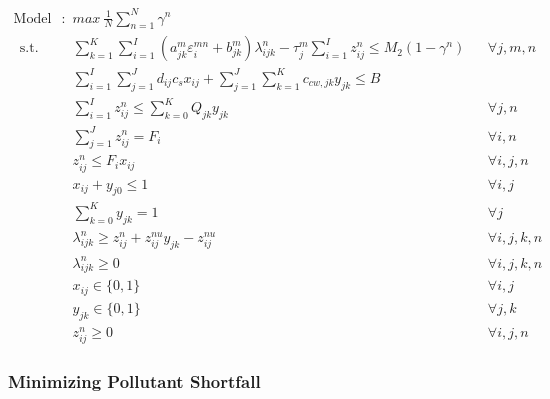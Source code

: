\documentclass[preprint,12pt,authoryear]{elsarticle}
\begin{document}
\begin{align}\label{modelS1}
	\text{Model S1}:~~&max ~ \frac{1}{N}\sum_{n=1}^N \gamma^n \nonumber \\~~
	\mbox{s.t.}~~
	&\sum_{k=1}^K \sum_{i=1}^I (a_{jk}^m \varepsilon_i^{mn} + b_{jk}^m) \lambda_{ijk}^n - \tau_j^m \sum_{i=1}^I z_{ij}^n \leq M_2 (1-\gamma^n) && \forall j,m,n\\	
	&\sum_{i=1}^{I}\sum_{j=1}^{J}d_{ij}c_s x_{ij} + \sum_{j=1}^{J}\sum_{k=1}^{K}c_{cw,jk}y_{jk} \leq B && \\
 	&\sum_{i=1}^{I} z_{ij}^n \leq \sum_{k=0}^K Q_{jk} y_{jk} && \forall j,n\\
	&\sum_{j=1}^J z_{ij}^n = F_i && \forall i,n\\
	&z_{ij}^n \leq F_i x_{ij} && \forall i,j,n\\
	&x_{ij} + y_{j0} \leq 1 && \forall i,j\\
	&\sum_{k=0}^{K}y_{jk} = 1&&\forall j\\
	&\lambda_{ijk}^n \geq z_{ij}^n + z_{ij}^{nu} y_{jk} - z_{ij}^{nu} && \forall i,j,k,n\\
	&\lambda_{ijk}^n \geq 0 && \forall i,j,k,n\\
	&x_{ij} \in \{0,1\}&&\forall i,j\\
	&y_{jk} \in \{0,1\}&&\forall j,k\\
	&z_{ij}^n \geq 0&&\forall i,j,n
\end{align}
\renewcommand{\theequation}{\thesection--\arabic{equation}}

\newpage
\subsubsection{Minimizing Pollutant Shortfall}\label{minshoftfall}
\end{document}
